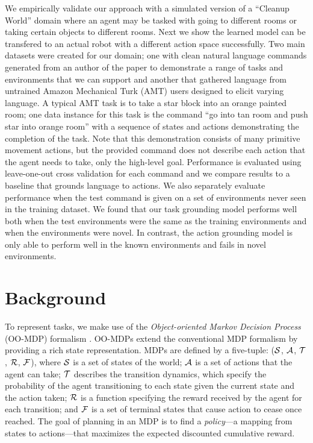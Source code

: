 \documentclass[conference]{IEEEtran}
\begin{document}
We empirically validate our approach with a simulated version of a ``Cleanup World'' domain where an agent may be tasked with going to different rooms or taking certain objects to different rooms. Next we show the learned model can be transfered to an actual robot with a different action space successfully. Two main datasets were created for our domain; one with clean natural language commands generated from an author of the paper to demonstrate a range of tasks and environments that we can support and another that gathered language from untrained Amazon Mechanical Turk (AMT) users designed to elicit varying language. A typical AMT task is to take a star block into an orange painted room; one data instance for this task is the command ``go into tan room and push star into orange room'' with a sequence of states and actions demonstrating the completion of the task. Note that this demonstration consists of many primitive movement actions, but the provided command does not describe each action that the agent needs to take, only the high-level goal. Performance is evaluated using leave-one-out cross validation for each command and we compare results to a baseline that grounds language to actions. We also separately evaluate performance when the test command is given on a set of environments never seen in the training dataset. We found that our task grounding model performs well both when the test environments were the same as the training environments and when the environments were novel. In contrast, the action grounding model is only able to perform well in the known environments and fails in novel environments.

\section{Background}
To represent tasks, we make use of the {\em Object-oriented Markov Decision Process} (OO-MDP) formalism \cite{diuk08b}. OO-MDPs extend the conventional MDP formalism by providing a rich state representation. MDPs are defined by a five-tuple: (${\cal S}$, ${\cal A}$, ${\cal T}$, ${\cal R}$, ${\cal F}$), where ${\cal S}$ is a set of states of the world; ${\cal A}$ is a set of actions that the agent can take; ${\cal T}$ describes the transition dynamics, which specify the probability of the agent transitioning to each state given the current state and the action taken; ${\cal R}$ is a function specifying the reward received by the agent for each transition; and ${\cal F}$ is a set of terminal states that cause action to cease once reached. The goal of planning in an MDP is to find a {\em policy}---a mapping from states to actions---that maximizes the expected discounted cumulative reward.
\end{document}
